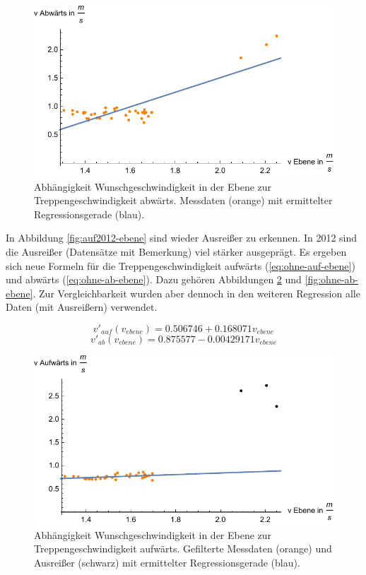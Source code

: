 \begin{figure} \centering 
	\includegraphics[]{abbildungen/regression/2012/ab-ebene.pdf}
	
	\caption{Abhängigkeit Wunschgeschwindigkeit in der Ebene zur Treppengeschwindigkeit abwärts. Messdaten (orange) mit ermittelter Regressionsgerade (blau). \label{fig:ab2012-ebene}}
\end{figure}

In Abbildung \ref{fig:auf2012-ebene} sind wieder Ausreißer zu erkennen. In 2012 sind die Ausreißer (Datensätze mit Bemerkung) viel stärker ausgeprägt. Es ergeben sich neue Formeln für die Treppengeschwindigkeit aufwärts (\ref{eq:ohne-auf-ebene}) und abwärts (\ref{eq:ohne-ab-ebene}). Dazu gehören Abbildungen \ref{fig:ohne-auf-ebene} und \ref{fig:ohne-ab-ebene}.
Zur Vergleichbarkeit wurden aber dennoch in den weiteren Regression alle Daten (mit Ausreißern) verwendet.


\begin{equation} \label{eq:ohne-auf-ebene}
	v'_{auf}(v_{ebene}) = 0.506746 + 0.168071  v_{ebene}
\end{equation}
\begin{equation} \label{eq:ohne-ab-ebene}
	v'_{ab}(v_{ebene}) = 0.875577 - 0.00429171 v_{ebene}
\end{equation}

\begin{figure} \centering 
	\includegraphics[]{abbildungen/regression/2012/ohneausreisser/auf-ebene.pdf}
	
	\caption{Abhängigkeit Wunschgeschwindigkeit in der Ebene zur Treppengeschwindigkeit aufwärts. Gefilterte Messdaten (orange) und Ausreißer (schwarz) mit ermittelter Regressionsgerade (blau). \label{fig:ohne-auf-ebene}}
\end{figure}

